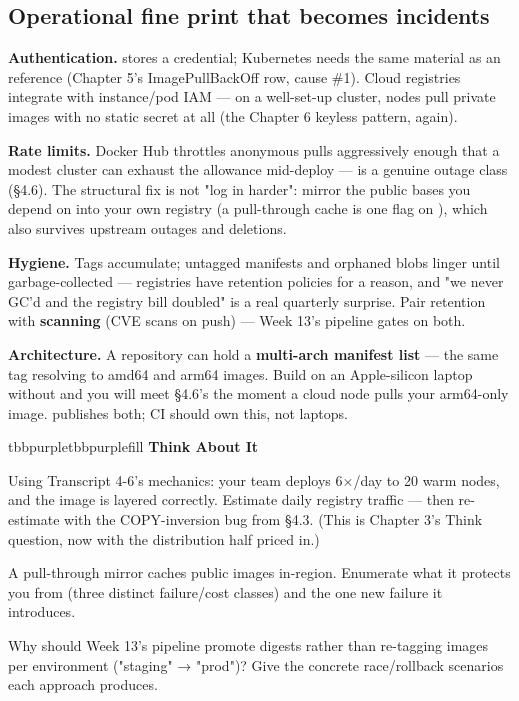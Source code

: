 \subsection*{Operational fine print that becomes incidents}

\begin{tbbitemize}
  \item \textbf{Authentication.}  stores a credential; Kubernetes needs the same material as an  reference (Chapter 5's ImagePullBackOff row, cause \#1). Cloud registries integrate with instance/pod IAM — on a well-set-up cluster, nodes pull private images with no static secret at all (the Chapter 6 keyless pattern, again).
  \item \textbf{Rate limits.} Docker Hub throttles anonymous pulls aggressively enough that a modest cluster can exhaust the allowance mid-deploy —  is a genuine outage class (§4.6). The structural fix is not "log in harder": mirror the public bases you depend on into your own registry (a pull-through cache is one flag on ), which also survives upstream outages and deletions.
  \item \textbf{Hygiene.} Tags accumulate; untagged manifests and orphaned blobs linger until garbage-collected — registries have retention policies for a reason, and "we never GC'd and the registry bill doubled" is a real quarterly surprise. Pair retention with \textbf{scanning} (CVE scans on push) — Week 13's pipeline gates on both.
  \item \textbf{Architecture.} A repository can hold a \textbf{multi-arch manifest list} — the same tag resolving to amd64 and arm64 images. Build on an Apple-silicon laptop without  and you will meet §4.6's  the moment a cloud node pulls your arm64-only image.  publishes both; CI should own this, not laptops.
\end{tbbitemize}

\begin{calloutbox}{tbbpurple}{tbbpurplefill}
{\normalsize\bfseries\color{tbbpurple}Think About It}\par\vspace{3pt}
\begin{tbbitemize}
  \item Using Transcript 4-6's mechanics: your team deploys 6×/day to 20 warm nodes, and the image is layered correctly. Estimate daily registry traffic — then re-estimate with the COPY-inversion bug from §4.3. (This is Chapter 3's Think question, now with the distribution half priced in.)
  \item A pull-through mirror caches public images in-region. Enumerate what it protects you from (three distinct failure/cost classes) and the one new failure it introduces.
  \item Why should Week 13's pipeline promote digests rather than re-tagging images per environment ("staging" → "prod")? Give the concrete race/rollback scenarios each approach produces.
\end{tbbitemize}
\end{calloutbox}

